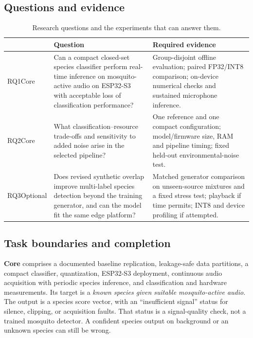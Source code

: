 \documentclass[a4paper,11pt]{article}
\newcommand{\core}{\textbf{Core}}
\begin{document}
\subsection{Questions and evidence}
\begin{table}[htbp]
\centering\small
\caption{Research questions and the experiments that can answer them.}
\label{tab:rq}
\begin{tabularx}{\linewidth}{P{1.3cm}Y Y}
\toprule
 & \textbf{Question} & \textbf{Required evidence}\\\midrule
RQ1\newline Core & Can a compact closed-set species classifier perform real-time inference on mosquito-active audio on ESP32-S3 with acceptable loss of classification performance? & Group-disjoint offline evaluation; paired FP32/INT8 comparison; on-device numerical checks and sustained microphone inference.\\
RQ2\newline Core & What classification--resource trade-offs and sensitivity to added noise arise in the selected pipeline? & One reference and one compact configuration; model/firmware size, RAM and pipeline timing; fixed held-out environmental-noise test.\\
RQ3\newline Optional & Does revised synthetic overlap improve multi-label species detection beyond the training generator, and can the model fit the same edge platform? & Matched generator comparison on unseen-source mixtures and a fixed stress test; playback if time permits; INT8 and device profiling if attempted.\\
\bottomrule
\end{tabularx}
\end{table}

\subsection{Task boundaries and completion}
\core{} comprises a documented baseline replication, leakage-safe data partitions, a compact classifier, quantization, ESP32-S3 deployment, continuous audio acquisition with periodic species inference, and classification and hardware measurements. Its target is a \emph{known species given suitable mosquito-active audio}. The output is a species score vector, with an ``insufficient signal'' status for silence, clipping, or acquisition faults. That status is a signal-quality check, not a trained mosquito detector. A confident species output on background or an unknown species can still be wrong.
\end{document}
